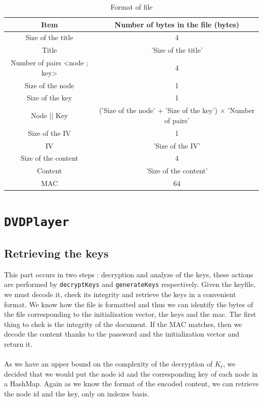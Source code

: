 \documentclass[a4paper,titlepage]{article}
\begin{document}
\renewcommand{\arraystretch}{1.6}
\begin{table}[h]
	\center
	\begin{tabular}{|c|c|}
		\hline
		\textbf{Item} & \textbf{Number of bytes in the file (bytes)}\\
		\hline
		Size of the title & 4\\
		\hline
		Title & 'Size of the title'\\
		\hline
		Number of pairs <node ; key> & 4\\
		\hline
		Size of the node & 1\\
		\hline
		Size of the key & 1\\
		\hline
		Node || Key & ('Size of the node' + 'Size of the key') $\times$ 'Number of pairs'\\
		\hline
		Size of the IV & 1\\
		\hline
		IV & 'Size of the IV'\\
		\hline
		Size of the content & 4\\
		\hline
		Content & 'Size of the content'\\
		\hline
		MAC & 64\\ 
		\hline
	\end{tabular}
	\caption{Format of file}
	\label{format}
\end{table}


\section{\texttt{DVDPlayer}}

	\subsection{Retrieving the keys}
This part occurs in two steps : decryption and analyze of the keys, these actions are performed by \texttt{decryptKeys} and \texttt{generateKeys} respectively.
Given the keyfile, we must decode it, check its integrity and retrieve the keys in a convenient format. We know how the file is formatted and thus we can identify the bytes of the file corresponding to the initialization vector, the keys and the mac. The first thing to chek is the integrity of the document. If the MAC matches, then we decode the content thanks to the password and the initialization vector and return it. \\ \\

As we have an upper bound on the complexity of the decryption of $K_t$, we decided that we would put the node id and the corresponding key of each node in a HashMap. Again as we know the format of the encoded content, we can retrieve the node id and the key, only on indexes basis.
\end{document}
